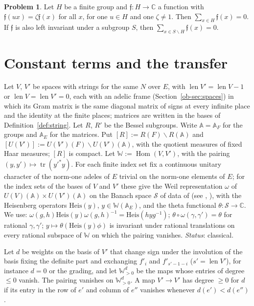 \documentclass[reqno]{amsart}
\theoremstyle{definition}
\newtheorem{problem}{Problem}[section]
\theoremstyle{plain}
\theoremstyle{remark}
\newcommand{\C}{\mathbb{C}}
\newcommand{\A}{\mathbb{A}}
\newcommand{\Sc}{\mathcal{S}}
\newcommand{\WW}{\mathbb{W}}
\newcommand{\Heis}{\mathrm{Heis}}
\newcommand{\Hom}{\operatorname{Hom}}
\newcommand{\tr}{\operatorname{tr}}
\newcommand{\len}{\operatorname{len}}
\begin{document}
\begin{problem}\label{pr:twisted-mean}
Let \(H\) be a finite group and \(\mathfrak f\colon H\to\C\) a function with \(\mathfrak f(ux)=\zeta\mathfrak f(x)\) for all \(x\), for one \(u\in H\) and one \(\zeta\ne1\).  Then \(\sum_{x\in H}\mathfrak f(x)=0\).  If \(\mathfrak f\) is also left invariant under a subgroup \(S\), then \(\sum_{x\in S\backslash H}\mathfrak f(x)=0\).
\end{problem}


\section{Constant terms and the transfer}\label{sec:transfer}

Let \(V\), \(V'\) be spaces with strings for the same \(N\) over \(E\), with \(\len V'=\len V-1\) or \(\len V=\len V'=0\), each with an adelic frame (Section~\ref{ob-sec:spaces}) in which its Gram matrix is the same diagonal matrix of signs at every infinite place and the identity at the finite places; matrices are written in the bases of Definition~\ref{def:string}.  Let \(R\), \(R'\) be the Bessel subgroups.  Write \(\A=\A_F\) for the groups and \(\A_E\) for the matrices.  Put \([R]:=R(F)\backslash R(\A)\) and \([U(V')]:=U(V')(F)\backslash U(V')(\A)\), with the quotient measures of fixed Haar measures; \([R]\) is compact.  Let \(\WW:=\Hom(V,V')\), with the pairing \((y,y')\mapsto\tr(y'^*y)\).  For each finite index set fix a continuous unitary character of the norm-one adeles of \(E\) trivial on the norm-one elements of \(E\); for the index sets of the bases of \(V\) and \(V'\) these give the Weil representation \(\omega\) of \(U(V)(\A)\times U(V')(\A)\) on the Banach space \(\Sc\) of data of \cite{GL} (see \cite{We}, \cite[\S1]{Ku}), with the Heisenberg operators \(\Heis(y)\), \(y\in\WW(\A_E)\), and the theta functional \(\theta\colon\Sc\to\C\).  We use: \(\omega(g,h)\Heis(y)\omega(g,h)^{-1}=\Heis(hyg^{-1})\); \(\theta\circ\omega(\gamma,\gamma')=\theta\) for rational \(\gamma,\gamma'\); \(y\mapsto\theta(\Heis(y)\phi)\) is invariant under rational translations on every rational subspace of \(\WW\) on which the pairing vanishes.  \emph{Status}: classical.

Let \(d\) be weights on the basis of \(V'\) that change sign under the involution of the basis fixing the definite part and exchanging \(f'_i\) and \(f'_{s'-1-i}\) (\(s'=\len V'\)), for instance \(d=0\) or the grading, and let \(\WW^d_{>0}\) be the maps whose entries of degree \(\le0\) vanish.  The pairing vanishes on \(\WW^d_{>0}\).  A map \(V'\to V'\) has degree \(\ge0\) for \(d\) if its entry in the row of \(e'\) and column of \(e''\) vanishes whenever \(d(e')<d(e'')\).
\end{document}
